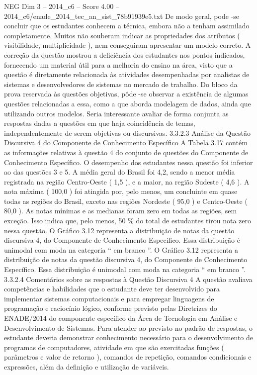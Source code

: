 \begin{textsample}{NEG Dim 3 – 2014\_c6 – Score 4.00 – 2014\_c6/enade\_2014\_tec\_an\_sist\_78b91939e5.txt}
De modo geral, pode -se concluir que os estudantes conhecem a técnica, embora não a tenham assimilado completamente.
Muitos não souberam indicar as propriedades dos atributos ( visibilidade, multiplicidade ), nem conseguiram apresentar um modelo correto.
A correção da questão mostrou a deficiência dos estudantes nos pontos indicados, fornecendo um material útil para a melhoria do ensino na área, visto que a questão é diretamente relacionada às atividades desempenhadas por analistas de sistemas e desenvolvedores de sistemas no mercado de trabalho.
Do bloco da prova reservada às questões objetivas, pôde -se observar a existência de algumas questões relacionadas a essa, como a que aborda modelagem de dados, ainda que utilizando outros modelos.
Seria interessante avaliar de forma conjunta as respostas dadas a questões em que haja coincidência de temas, independentemente de serem objetivas ou discursivas. 3.3.2.3 Análise da Questão Discursiva 4 do Componente de Conhecimento Específico A Tabela 3.17 contém as informações relativas à questão 4 do conjunto de questões do Componente de Conhecimento Específico.
O desempenho dos estudantes nessa questão foi inferior ao das questões 3 e 5.
A média geral do Brasil foi 4,2, sendo a menor média registrada na região Centro-Oeste ( 1,5 ), e a maior, na região Sudeste ( 4,6 ).
A nota máxima ( 100,0 ) foi atingida por, pelo menos, um concluinte em quase todas as regiões do Brasil, exceto nas regiões Nordeste ( 95,0 ) e Centro-Oeste ( 80,0 ).
As notas mínimas e as medianas foram zero em todas as regiões, sem exceção.
Isso indica que, pelo menos, 50 \% do total de estudantes tirou nota zero nessa questão.
O Gráfico 3.12 representa a distribuição de notas da questão discursiva 4, do Componente de Conhecimento Específico.
Essa distribuição é unimodal com moda na categoria “ em branco ”.
O Gráfico 3.12 representa a distribuição de notas da questão discursiva 4, do Componente de Conhecimento Específico.
Essa distribuição é unimodal com moda na categoria “ em branco ”. 3.3.2.4 Comentários sobre as respostas à Questão Discursiva 4 A questão avaliava competências e habilidades que o estudante deve ter desenvolvido para implementar sistemas computacionais e para empregar linguagens de programação e raciocínio lógico, conforme previsto pelas Diretrizes do ENADE/2014 do componente específico da Área de Tecnologia em Análise e Desenvolvimento de Sistemas.
Para atender ao previsto no padrão de respostas, o estudante deveria demonstrar conhecimento necessário para o desenvolvimento de programas de computadores, atividade em que são exercitadas funções ( parâmetros e valor de retorno ), comandos de repetição, comandos condicionais e expressões, além da definição e utilização de variáveis.

\end{textsample}
